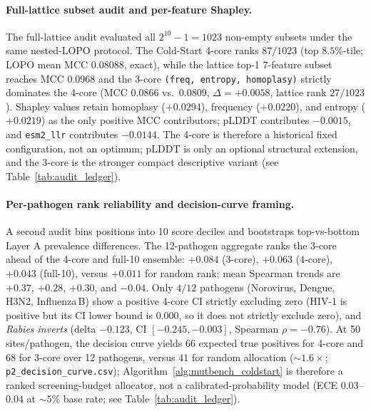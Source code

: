 \paragraph{Full-lattice subset audit and per-feature Shapley.}
\label{para:full_lattice_shapley}
The full-lattice audit evaluated all $2^{10} - 1 = 1023$ non-empty subsets under the same nested-LOPO protocol. The Cold-Start 4-core ranks $87/1023$ (top $8.5$\%-tile; LOPO mean MCC $0.08088$, exact), while the lattice top-1 7-feature subset reaches MCC $0.0968$ and the 3-core \texttt{(freq, entropy, homoplasy)} strictly dominates the 4-core (MCC $0.0866$ vs.\ $0.0809$, $\Delta = +0.0058$, lattice rank $27/1023$). Shapley values retain homoplasy ($+0.0294$), frequency ($+0.0220$), and entropy ($+0.0219$) as the only positive MCC contributors; pLDDT contributes $-0.0015$, and \texttt{esm2\_llr} contributes $-0.0144$. The 4-core is therefore a historical fixed configuration, not an optimum; pLDDT is only an optional structural extension, and the 3-core is the stronger compact descriptive variant (see Table~\ref{tab:audit_ledger}).

\paragraph{Per-pathogen rank reliability and decision-curve framing.}
\label{para:rank_reliability}
A second audit bins positions into 10 score deciles and bootstraps top-vs-bottom Layer A prevalence differences. The 12-pathogen aggregate ranks the 3-core ahead of the 4-core and full-10 ensemble: $+0.084$ (3-core), $+0.063$ (4-core), $+0.043$ (full-10), versus $+0.011$ for random rank; mean Spearman trends are $+0.37$, $+0.28$, $+0.30$, and $-0.04$. Only $4/12$ pathogens (Norovirus, Dengue, H3N2, Influenza\,B) show a positive 4-core CI strictly excluding zero (HIV-1 is positive but its CI lower bound is $0.000$, so it does not strictly exclude zero), and \emph{Rabies inverts} (delta $-0.123$, CI $[-0.245, -0.003]$, Spearman $\rho = -0.76$). At 50 sites/pathogen, the decision curve yields 66 expected true positives for 4-core and 68 for 3-core over 12 pathogens, versus $41$ for random allocation ($\sim 1.6\times$; \texttt{p2\_decision\_curve.csv}); Algorithm~\ref{alg:mutbench_coldstart} is therefore a ranked screening-budget allocator, not a calibrated-probability model (ECE $0.03$--$0.04$ at $\sim 5$\% base rate; see Table~\ref{tab:audit_ledger}).

